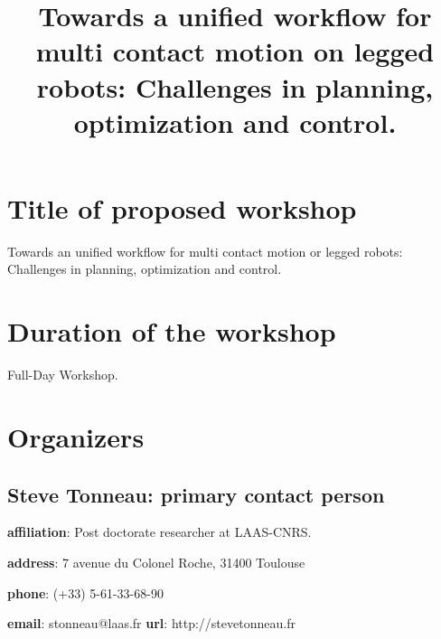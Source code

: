 \documentclass[conference]{IEEEtran}
\begin{document}
%
\title{Towards a unified workflow for multi contact motion on legged robots: Challenges in planning, optimization and control.}

\maketitle


\section{\textbf{Title} of proposed workshop}
Towards an unified workflow for multi contact motion or legged robots: Challenges in planning, optimization and control.

\section{Duration of the workshop}
Full-Day Workshop.

\section{Organizers}
\subsection*{Steve Tonneau: primary contact person}
\textbf{affiliation}: Post doctorate researcher at LAAS-CNRS.

\textbf{address}: 7 avenue du Colonel Roche, 31400 Toulouse

\textbf{phone}: (+33) 5-61-33-68-90

\textbf{email}: stonneau@laas.fr
\textbf{url}: http://stevetonneau.fr
\end{document}
